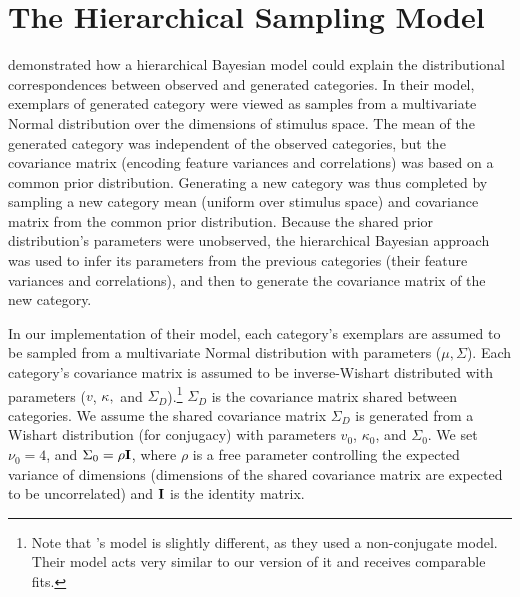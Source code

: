 \documentclass[12pt]{article}
\newcommand\nbcnote[1]{\todo[inline, backgroundcolor = yellow]{\textbf{NBC}: #1}}
\begin{document}
\clearpage


\clearpage


\appendix

\section{The Hierarchical Sampling Model}
\label{ap:hsampling-definition}

\cite{jern2013probabilistic} demonstrated how a hierarchical Bayesian model could explain the distributional correspondences between observed and generated categories. In their model, exemplars of generated category were viewed as samples from a multivariate Normal distribution over the dimensions of stimulus space. The mean of the generated category was independent of the observed categories, but the covariance matrix (encoding feature variances and correlations) was based on a common prior distribution. Generating a new category was thus completed by sampling a new category mean (uniform over stimulus space) and covariance matrix from the common prior distribution. Because the shared prior distribution's parameters were unobserved, the hierarchical Bayesian approach was used to infer its parameters from the previous categories (their feature variances and correlations), and then to generate the covariance matrix of the new category.

In our implementation of their model, each category's exemplars are assumed to be sampled from a multivariate Normal distribution with parameters ($\mu, \Sigma$). Each category's covariance matrix is assumed to be inverse-Wishart distributed with parameters ($v$, $\kappa,$ and $\Sigma_D$).\footnote{Note that \citet{jern2013probabilistic}'s model is slightly different, as they used a non-conjugate model. Their model acts very similar to our version of it and receives comparable fits.} $\Sigma_D$ is the covariance matrix shared between categories. We assume the shared covariance matrix $\Sigma_D$ is generated from a Wishart distribution (for conjugacy) with parameters $v_0$, $\kappa_0$, and $\Sigma_0$. We set $\nu_0 = 4$, and $\Sigma_0 = \rho {\bf I}$, where $\rho$ is a free parameter controlling the expected variance of dimensions (dimensions of the shared covariance matrix are expected to be uncorrelated) and ${\bf I}$ is the identity matrix.

\nbcnote{check on that $\nu_0 = 4$ business}
\end{document}
